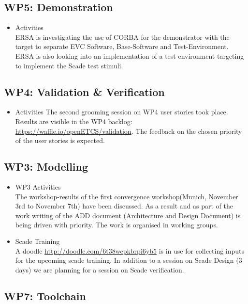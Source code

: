 \documentclass[a4paper, 11pt]{article}
\begin{document}
\subsection{WP5: Demonstration}
\begin{itemize}
\item Activities\\
ERSA is investigating the use of CORBA for the demonstrator with the target to separate EVC Software, Base-Software and Test-Environment.
ERSA is also looking into an implementation of a test environment targeting to implement the Scade test stimuli.

\end{itemize}

\subsection{WP4: Validation \& Verification}
\begin{itemize}
\item Activities
The second grooming session on WP4 user stories took place. Results are visible in the WP4 backlog:
\url{https://waffle.io/openETCS/validation}. The feedback on the chosen priority of the user stories is expected.
\end{itemize}

\subsection{WP3: Modelling}
\begin{itemize}

\item WP3 Activities\\
The workshop-results of the first convergence workshop(Munich, November 3rd to November 7th) have been discussed.
As a result and as part of the work writing of the ADD document (Architecture and Design Document) is being driven with priority.
The work is organised in working groups.

\item Scade Training\\
A doodle \url{http://doodle.com/6t38wcpkbrpi6yb5} is in use for collecting inputs for the upcoming scade training. In addition to a session on Scade Design (3 days) we are planning for a session on Scade verification. 
\end{itemize}

\subsection{WP7: Toolchain}
\end{document}
